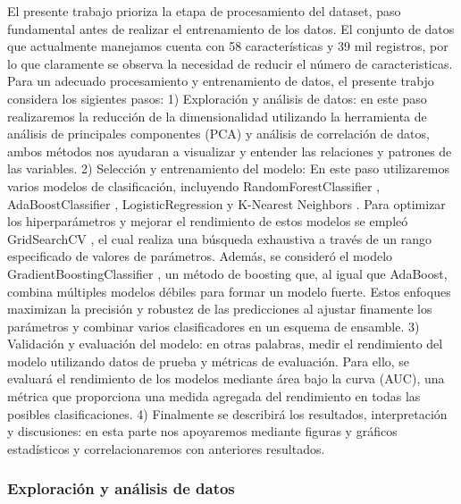 \documentclass[
  number,
  preprint,
  3p,
  twocolumn]{elsarticle}
\begin{document}
El presente trabajo prioriza la etapa de procesamiento del dataset, paso
fundamental antes de realizar el entrenamiento de los datos. El conjunto
de datos que actualmente manejamos cuenta con 58 características y 39
mil registros, por lo que claramente se observa la necesidad de reducir
el número de caracteristicas. Para un adecuado procesamiento y
entrenamiento de datos, el presente trabjo considera los sigientes
pasos: 1) Exploración y análisis de datos: en este paso realizaremos la
reducción de la dimensionalidad utilizando la herramienta de análisis de
principales componentes (PCA) y análisis de correlación de datos, ambos
métodos nos ayudaran a visualizar y entender las relaciones y patrones
de las variables. 2) Selección y entrenamiento del modelo: En este paso
utilizaremos varios modelos de clasificación, incluyendo
RandomForestClassifier \citep{breiman2001}, AdaBoostClassifier
\citep{freund1997}, LogisticRegression \citep{cox1958} y K-Nearest
Neighbors \citep{hodges1951}. Para optimizar los hiperparámetros y
mejorar el rendimiento de estos modelos se empleó GridSearchCV
\citep{pedregosa2011}, el cual realiza una búsqueda exhaustiva a través
de un rango especificado de valores de parámetros. Además, se consideró
el modelo GradientBoostingClassifier \citep{friedman2001}, un método de
boosting que, al igual que AdaBoost, combina múltiples modelos débiles
para formar un modelo fuerte. Estos enfoques maximizan la precisión y
robustez de las predicciones al ajustar finamente los parámetros y
combinar varios clasificadores en un esquema de ensamble. 3) Validación
y evaluación del modelo: en otras palabras, medir el rendimiento del
modelo utilizando datos de prueba y métricas de evaluación. Para ello,
se evaluará el rendimiento de los modelos mediante área bajo la curva
(AUC), una métrica que proporciona una medida agregada del rendimiento
en todas las posibles clasificaciones. 4) Finalmente se describirá los
resultados, interpretación y discusiones: en esta parte nos apoyaremos
mediante figuras y gráficos estadísticos y correlacionaremos con
anteriores resultados.

\subsubsection{Exploración y análisis de
datos}\label{exploraciuxf3n-y-anuxe1lisis-de-datos}
\end{document}
